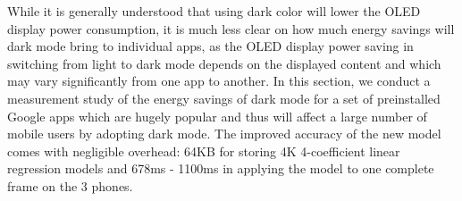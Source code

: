 While it is generally understood that using dark color will lower the OLED
display power consumption, it is much less clear on how much
energy savings will dark mode bring to individual apps, as the
OLED display power saving in switching from light to 
dark mode depends on the displayed content and which may vary
significantly from one app to another. In this section, we conduct a
measurement study of the energy savings of dark mode for a set of
preinstalled Google apps which are hugely popular and thus will affect
a large number of mobile users by adopting dark mode.
The improved accuracy of the new model comes with negligible overhead:
64KB for storing 4K 4-coefficient linear regression models
and 678ms - 1100ms in applying the model to one complete frame on the 3 phones.

\fi

